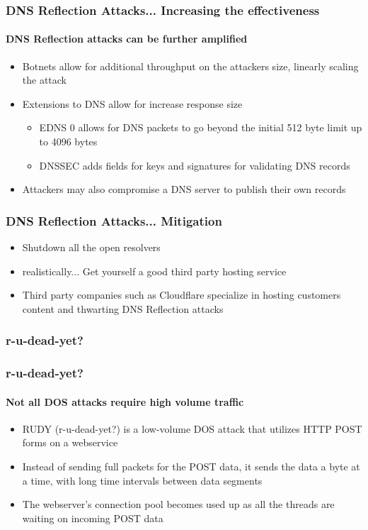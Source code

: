 \documentclass{beamer}
\begin{document}
\begin{frame}
	\frametitle{DNS Reflection Attacks... Increasing the effectiveness}
	\framesubtitle{DNS Reflection attacks can be further amplified }
	\begin{itemize}
		\item Botnets allow for additional throughput on the attackers size,
			linearly scaling the attack
		\item Extensions to DNS allow for increase response size
			\begin{itemize}
				\item EDNS 0 allows for DNS packets to go beyond the initial 512 byte
					limit up to 4096 bytes
				\item DNSSEC adds fields for keys and signatures for validating DNS
					records
			\end{itemize}
		\item Attackers may also compromise a DNS server to publish their own
			records
	\end{itemize}
\end{frame}

\begin{frame}
	\frametitle{DNS Reflection Attacks... Mitigation}
	\begin{itemize}
		\item Shutdown all the open resolvers
			\pause
		\item realistically...
			\pause
			Get yourself a good third party hosting service
			\pause
		\item Third party companies such as Cloudflare specialize in hosting customers
			content and thwarting DNS Reflection attacks
	\end{itemize}
\end{frame}

\begin{frame}
	\frametitle{r-u-dead-yet?}
\end{frame}

\begin{frame}
	\frametitle{r-u-dead-yet?}
	\framesubtitle{Not all DOS attacks require high volume traffic}
	\begin{itemize}
		\item RUDY (r-u-dead-yet?) is a low-volume DOS attack that utilizes HTTP
			POST forms on a webservice
		\item Instead of sending full packets for the POST data, it sends the data a
			byte at a time, with long time intervals between data segments
		\item The webserver's connection pool becomes used up as all the threads are
			waiting on incoming POST data
	\end{itemize}
\end{frame}
\end{document}
